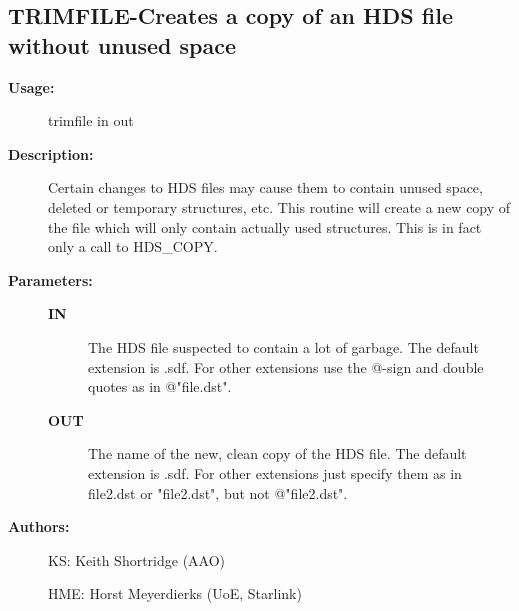\subsection{TRIMFILE-\label{TRIMFILE}Creates a copy of an HDS file without unused space}
\begin{description}

\item [{\bf Usage:}]
 trimfile in out

\item [{\bf Description:}]
 Certain changes to HDS files may cause them to contain unused
 space, deleted or temporary structures, etc. This routine will
 create a new copy of the file which will only contain actually
 used structures.  This is in fact only a call to HDS_COPY.

\item [{\bf Parameters:}]
\begin{description}
\item [{\bf IN}]
 The HDS file suspected to contain a lot of garbage. The default
 extension is .sdf. For other extensions use the @-sign and
 double quotes as in @"file.dst".
\item [{\bf OUT}]
 The name of the new, clean copy of the HDS file. The default
 extension is .sdf. For other extensions just specify them as in
 file2.dst or "file2.dst", but not @"file2.dst".
\end{description}

\item [{\bf Authors:}]
 KS: Keith Shortridge (AAO)

 HME: Horst Meyerdierks (UoE, Starlink)
\end{description}
